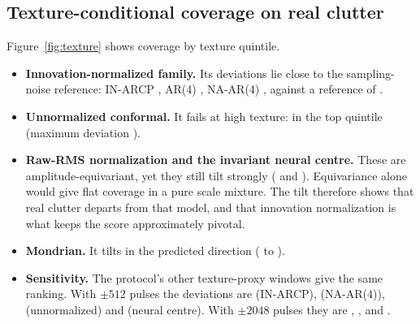 \subsection{Texture-conditional coverage on real clutter}
Figure~\ref{fig:texture} shows coverage by texture quintile.
\begin{itemize}[leftmargin=*,itemsep=1pt]
\item \textbf{Innovation-normalized family.} Its deviations lie close to the sampling-noise reference: IN-ARCP \MaxdevINOnemSixteenA, AR(4) \MaxdevINFourmSixteenA, NA-AR(4) \MaxdevNAFourmSixteenA, against a reference of \RefINOnemSixteenA.
\item \textbf{Unnormalized conformal.} It fails at high texture: \CurveHighUmSixteenA{} in the top quintile (maximum deviation \MaxdevUmSixteenA).
\item \textbf{Raw-RMS normalization and the invariant neural centre.} These are amplitude-equivariant, yet they still tilt strongly (\MaxdevRMSmSixteenA{} and \MaxdevMLPmSixteenA). Equivariance alone would give flat coverage in a pure scale mixture. The tilt therefore shows that real clutter departs from that model, and that innovation normalization is what keeps the score approximately pivotal.
\item \textbf{Mondrian.} It tilts in the predicted direction (\CurveLowMONmSixteenA{} to \CurveHighMONmSixteenA).
\item \textbf{Sensitivity.} The protocol's other texture-proxy windows give the same ranking. With $\pm512$ pulses the deviations are \MaxdevINOneWFiveTwelve{} (IN-ARCP), \MaxdevNAFourWFiveTwelve{} (NA-AR(4)), \MaxdevUWFiveTwelve{} (unnormalized) and \MaxdevMLPWFiveTwelve{} (neural centre). With $\pm2048$ pulses they are \MaxdevINOneWTwentyFortyEight, \MaxdevNAFourWTwentyFortyEight, \MaxdevUWTwentyFortyEight{} and \MaxdevMLPWTwentyFortyEight.
\end{itemize}

